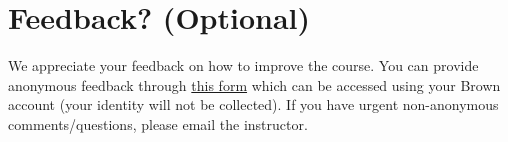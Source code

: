 \documentclass{csci1430}
\begin{document}
\pagebreak
\section*{Feedback? (Optional)}
We appreciate your feedback on how to improve the course. You can provide anonymous feedback through \href{https://forms.gle/Eu5jJbDUmLknAyJV9}{this form} which can be accessed using your Brown account (your identity will not be collected). If you have urgent non-anonymous comments/questions, please email the instructor.
\end{document}
